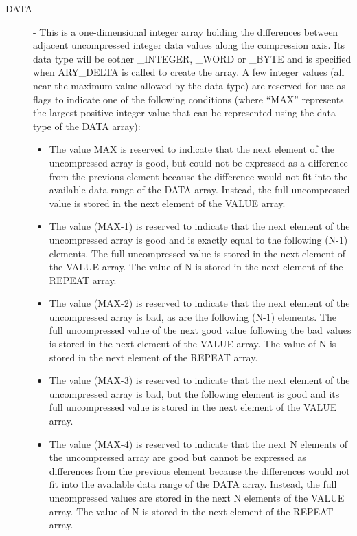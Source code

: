 \documentclass[twoside,11pt]{article}
\begin{document}
\begin{description}

\item[DATA] - This is a one-dimensional integer array holding the differences
between adjacent uncompressed integer data values along the compression
axis. Its data type will be eother \_INTEGER, \_WORD or \_BYTE and is
specified when ARY\_DELTA is called to create the array. A few integer
values (all near the maximum value allowed by the data type) are reserved
for use as flags to indicate one of the following conditions (where
``MAX'' represents the largest positive integer value that can be
represented using the data type of the DATA array):

\begin{itemize}

\item The value MAX is reserved to indicate that the next element of the
uncompressed array is good, but could not be expressed as a difference from
the previous element because the difference would not fit into the
available data range of the DATA array. Instead, the full uncompressed value
is stored in the next element of the VALUE array.

\item The value (MAX-1) is reserved to indicate that the next element of
the uncompressed array is good and is exactly equal to the following (N-1)
elements. The full uncompressed value is stored in the next element of the
VALUE array. The value of N is stored in the next element of the REPEAT array.

\item The value (MAX-2) is reserved to indicate that the next element of
the uncompressed array is bad, as are the following (N-1) elements. The full
uncompressed value of the next good value following the bad values is stored
in the next element of the VALUE array. The value of N is stored in the next
element of the REPEAT array.

\item The value (MAX-3) is reserved to indicate that the next element of
the uncompressed array is bad, but the following element is good and its
full uncompressed value is stored in the next element of the VALUE array.

\item The value (MAX-4) is reserved to indicate that the next N elements of
the uncompressed array are good but cannot be expressed as differences from
the previous element because the differences would not fit into the available
data range of the DATA array. Instead, the full uncompressed values are
stored in the next N elements of the VALUE array. The value of N is
stored in the next element of the REPEAT array.


\end{itemize}
\end{description}
\end{document}
